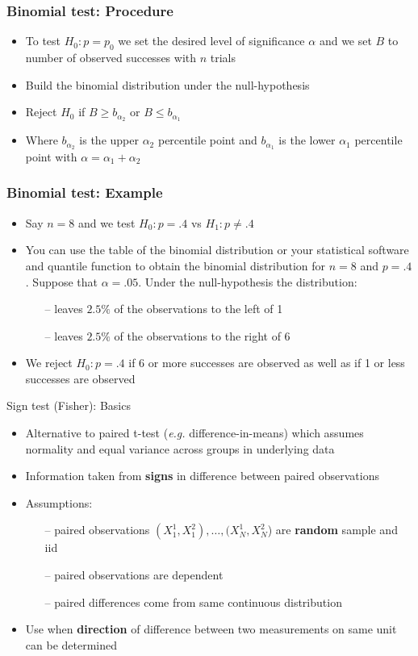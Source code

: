 \documentclass[xcolor=table,dvipsnames]{beamer}
\begin{document}
\begin{frame}
\frametitle{Binomial test: Procedure}
\begin{itemize}	
\item To test $H_0: p = p_0$ we set the desired level of significance $\alpha$ and we set $B$ to number of observed successes with $n$ trials \pause
\item Build the binomial distribution under the null-hypothesis \pause
\item Reject $H_0$ if $B\geq b_{\alpha_{2}}$ or $B\leq b_{\alpha_{1}}$ \pause
\item Where $b_{\alpha_{2}}$ is the upper $\alpha_2$ percentile point and $b_{\alpha_{1}}$ is the lower $\alpha_1$ percentile point with $\alpha = \alpha_1 + \alpha_2$ 
\end{itemize}
\end{frame}

\begin{frame}
\frametitle{Binomial test: Example}
\begin{itemize}	
\item Say $n=8$ and we test $H_0:p=.4$ vs $H_1: p\neq.4$\pause
\item You can use the table of the binomial distribution or your statistical software and quantile function to obtain the binomial distribution for $n=8$ and $p=.4$. Suppose that $\alpha=.05$. Under the null-hypothesis the distribution: \pause
	\begin{itemize}
	\item[--] leaves $2.5\%$ of the observations to the left of 1
	\item[--] leaves $2.5\%$ of the observations to the right of 6
	\end{itemize}
\item We reject $H_0: p = .4$ if 6 or more successes are observed as well as if 1 or less successes are observed 
\end{itemize}
\end{frame}

\begin{frame}{Sign test (Fisher): Basics}
\begin{itemize}
\item Alternative to paired t-test (\emph{e.g.} difference-in-means) which assumes normality and equal variance across groups in underlying data \pause
\item Information taken from \textbf{signs} in difference between paired observations \pause
\item Assumptions: \pause
	\begin{itemize}
	\item[--] paired observations $(X_1^1,X_1^2),\ldots,(X_N^1,X_N^2$) are \textbf{random} sample and iid
	\item[--] paired observations are dependent
	\item[--] paired differences come from same continuous distribution
	\end{itemize} \pause
\item Use when \textbf{direction} of difference between two measurements on same unit can be determined
\end{itemize}
\end{frame}
\end{document}
